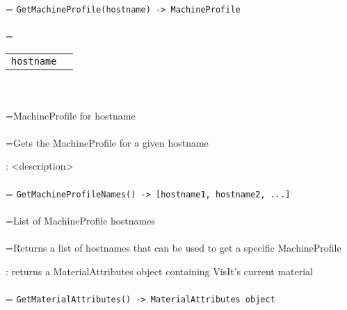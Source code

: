 \documentclass[10pt,a4paper]{report}
\begin{document}
 \\ 
\hangindent=\parindent 
\verb!GetMachineProfile(hostname) -> MachineProfile!\\ [-3mm]

 \\ 
\hangindent=\parindent 
\begin{tabular}{ll}
\verb!hostname! &  \\
\end{tabular} \\[-2mm]


 \\ 
\hangindent=\parindent MachineProfile for hostname \\[-3mm] 

 \\ 
\hangindent=\parindent Gets the MachineProfile for a given hostname \\[-3mm] 

\newpage


{}
: <description>\\[-3mm]

 \\ 
\hangindent=\parindent 
\verb!GetMachineProfileNames() -> [hostname1, hostname2, ...]!\\ [-3mm]

 \\ 
\hangindent=\parindent List of MachineProfile hostnames \\[-3mm] 

 \\ 
\hangindent=\parindent Returns a list of hostnames that can be used to get a specific MachineProfile \\[-3mm] 

\newpage


{}
: returns a MaterialAttributes object containing VisIt's current material\\[-3mm]

 \\ 
\hangindent=\parindent 
\verb!GetMaterialAttributes() -> MaterialAttributes object!\\ [-3mm]
\end{document}
